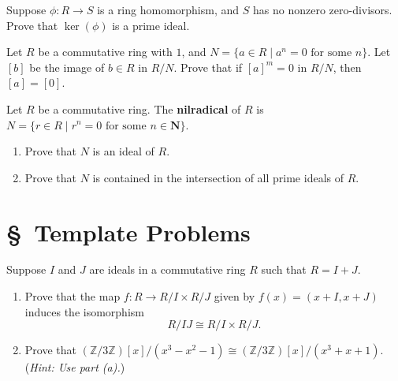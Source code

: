 \documentclass[11pt,twoside,openany]{memoir}
\begin{document}
    \begin{exercise}
    Suppose $\phi:R\to S$ is a ring homomorphism, and $S$ has no nonzero zero-divisors. Prove that $\ker(\phi)$ is a prime ideal.
    \end{exercise}
    
    \begin{exercise}
    Let $R$ be a commutative ring with $1$, and $N=\{a\in R\mid a^n=0 \text{ for some }n\}$. Let $[b]$ be the image of $b\in R$ in $R/N$. Prove that if $[a]^m=0$ in $R/N$, then $[a]=[0]$.
    \end{exercise}
    
    \begin{exercise}
    Let $R$ be a commutative ring. The \textbf{nilradical} of $R$ is $N=\{r\in R\mid r^n=0 \text{ for some } n\in \mathbf{N}\}$.
    \begin{enumerate}[label=(\alph*)]
        \item Prove that $N$ is an ideal of $R$.
        \item Prove that $N$ is contained in the intersection of all prime ideals of $R$.
    \end{enumerate}
    \end{exercise}
    

\section*{\S\ Template Problems}
\begin{exercise}
    Suppose $I$ and $J$ are ideals in a commutative ring $R$ such that $R=I+J$. 
    \begin{enumerate}[label=(\alph*)]
        \item Prove that the map $f:R\to R/I\times R/J$ given by $f(x)=(x+I,x+J)$ induces the isomorphism
        \[
            R/IJ \cong R/I \times R/J.
        \]
        \item Prove that $\left(\mathbb{Z}/3\mathbb{Z}\right)[x]/(x^3-x^2-1)\cong \left(\mathbb{Z}/3\mathbb{Z}\right)[x]/(x^3+x+1)$. (\textit{Hint: Use part (a).})
    \end{enumerate}
    \end{exercise}
    
\end{document}
